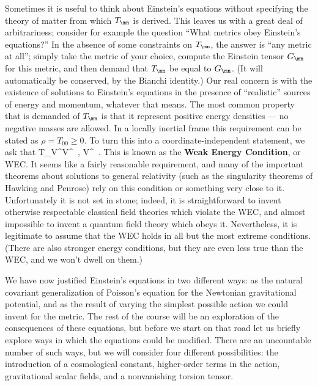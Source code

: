 Sometimes it is useful to think about Einstein's equations without
specifying the theory of matter from which $T_\mn$ is derived.  
This leaves us with a great deal of arbitrariness; consider for
example the question ``What metrics obey Einstein's equations?''
In the absence of some constraints on $T_\mn$, the answer is ``any
metric at all''; simply take the metric of your choice, compute the
Einstein tensor $G_\mn$ for this metric, and then demand that
$T_\mn$ be equal to $G_\mn$.  (It will automatically be conserved,
by the Bianchi identity.)  Our real concern is with the existence
of solutions to Einstein's equations in the presence of ``realistic''
sources of energy and momentum, whatever that means.  The most
common property that is demanded of $T_\mn$ is that it represent
positive energy densities --- no negative masses are allowed.  In
a locally inertial frame this requirement can be stated as
$\rho = T_{00} \geq 0$.  To turn this into a coordinate-independent
statement, we ask that
\be
  T_\mn V^\mu V^\nu {}\ ,
  V^\mu\ .\label{4.72}
\ee
This is known as the {\bf Weak Energy Condition}, or WEC.  It seems 
like a fairly
reasonable requirement, and many of the important theorems about 
solutions to general relativity (such as the singularity theorems
of Hawking and Penrose) rely on this condition or something very
close to it.  Unfortunately it is not set in stone; indeed, it is
straightforward to invent otherwise respectable classical field
theories which violate the WEC, and almost impossible to invent a
quantum field theory which obeys it.  Nevertheless, it is legitimate
to assume that the WEC holds in all but the most extreme conditions.
(There are also stronger energy conditions, but they are even less
true than the WEC, and we won't dwell on them.)

We have now justified Einstein's equations in two different ways:
as the natural covariant generalization of Poisson's equation for
the Newtonian gravitational potential, and as the result of varying
the simplest possible action we could invent for the metric.  The
rest of the course will be an exploration of the consequences of
these equations, but before we start on that road let us briefly
explore ways in which the equations could be modified.  There are
an uncountable number of such ways, but we will consider four
different possibilities: the introduction of a cosmological constant,
higher-order terms in the action, gravitational scalar fields, and
a nonvanishing torsion tensor.

